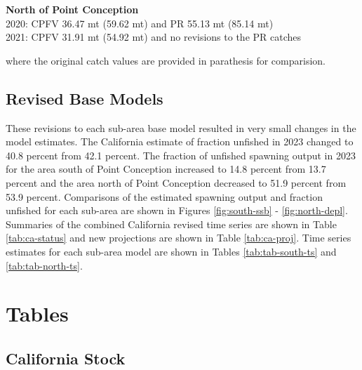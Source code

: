 \documentclass[
  letterpaper,
]{article}
\begin{document}
\textbf{North of Point Conception}\\
2020: CPFV 36.47 mt (59.62 mt) and PR 55.13 mt (85.14 mt)\\
2021: CPFV 31.91 mt (54.92 mt) and no revisions to the PR catches

where the original catch values are provided in parathesis for comparision.

\hypertarget{revised-base-models}{%
\subsection{Revised Base Models}\label{revised-base-models}}

These revisions to each sub-area base model resulted in very small changes in the model estimates. The California estimate of fraction unfished in 2023 changed to 40.8 percent from 42.1 percent. The fraction of unfished spawning output in 2023 for the area south of Point Conception increased to 14.8 percent from 13.7 percent and the area north of Point Conception decreased to 51.9 percent from 53.9 percent. Comparisons of the estimated spawning output and fraction unfished for each sub-area are shown in Figures \ref{fig:south-ssb} - \ref{fig:north-depl}. Summaries of the combined California revised time series are shown in Table \ref{tab:ca-status} and new projections are shown in Table \ref{tab:ca-proj}. Time series estimates for each sub-area model are shown in Tables \ref{tab:tab-south-ts} and \ref{tab:tab-north-ts}.

\pagebreak

\hypertarget{tables}{%
\section{Tables}\label{tables}}

\hypertarget{california-stock}{%
\subsection{California Stock}\label{california-stock}}

\begingroup\fontsize{10}{12}\selectfont
\begingroup\fontsize{10}{12}\selectfont
\end{document}
